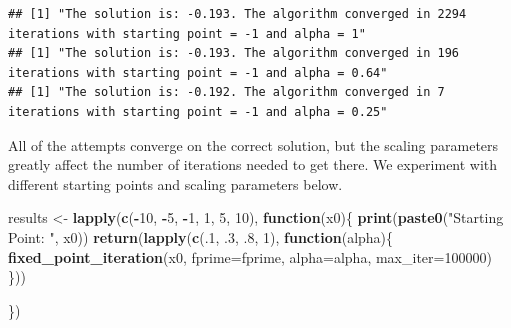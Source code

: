 \documentclass[]{article}
\newenvironment{Shaded}{\begin{snugshade}}{\end{snugshade}}
\newcommand{\KeywordTok}[1]{\textcolor[rgb]{0.13,0.29,0.53}{\textbf{#1}}}
\newcommand{\DataTypeTok}[1]{\textcolor[rgb]{0.13,0.29,0.53}{#1}}
\newcommand{\DecValTok}[1]{\textcolor[rgb]{0.00,0.00,0.81}{#1}}
\newcommand{\StringTok}[1]{\textcolor[rgb]{0.31,0.60,0.02}{#1}}
\newcommand{\ControlFlowTok}[1]{\textcolor[rgb]{0.13,0.29,0.53}{\textbf{#1}}}
\newcommand{\OperatorTok}[1]{\textcolor[rgb]{0.81,0.36,0.00}{\textbf{#1}}}
\newcommand{\NormalTok}[1]{#1}
\begin{document}
\begin{verbatim}
## [1] "The solution is: -0.193. The algorithm converged in 2294 iterations with starting point = -1 and alpha = 1"
## [1] "The solution is: -0.193. The algorithm converged in 196 iterations with starting point = -1 and alpha = 0.64"
## [1] "The solution is: -0.192. The algorithm converged in 7 iterations with starting point = -1 and alpha = 0.25"
\end{verbatim}

All of the attempts converge on the correct solution, but the scaling
parameters greatly affect the number of iterations needed to get there.
We experiment with different starting points and scaling parameters
below.

\begin{Shaded}
\begin{Highlighting}[]
\NormalTok{results <-}\StringTok{ }\KeywordTok{lapply}\NormalTok{(}\KeywordTok{c}\NormalTok{(}\OperatorTok{-}\DecValTok{10}\NormalTok{, }\OperatorTok{-}\DecValTok{5}\NormalTok{, }\OperatorTok{-}\DecValTok{1}\NormalTok{, }\DecValTok{1}\NormalTok{, }\DecValTok{5}\NormalTok{, }\DecValTok{10}\NormalTok{), }\ControlFlowTok{function}\NormalTok{(x0)\{}
  \KeywordTok{print}\NormalTok{(}\KeywordTok{paste0}\NormalTok{(}\StringTok{"Starting Point: "}\NormalTok{, x0))}
  \KeywordTok{return}\NormalTok{(}\KeywordTok{lapply}\NormalTok{(}\KeywordTok{c}\NormalTok{(.}\DecValTok{1}\NormalTok{, .}\DecValTok{3}\NormalTok{, .}\DecValTok{8}\NormalTok{, }\DecValTok{1}\NormalTok{), }\ControlFlowTok{function}\NormalTok{(alpha)\{}
    \KeywordTok{fixed_point_iteration}\NormalTok{(x0, }\DataTypeTok{fprime=}\NormalTok{fprime, }\DataTypeTok{alpha=}\NormalTok{alpha, }\DataTypeTok{max_iter=}\DecValTok{100000}\NormalTok{)  }
\NormalTok{  \}))  }
  
\NormalTok{\})}
\end{Highlighting}
\end{Shaded}
\end{document}
